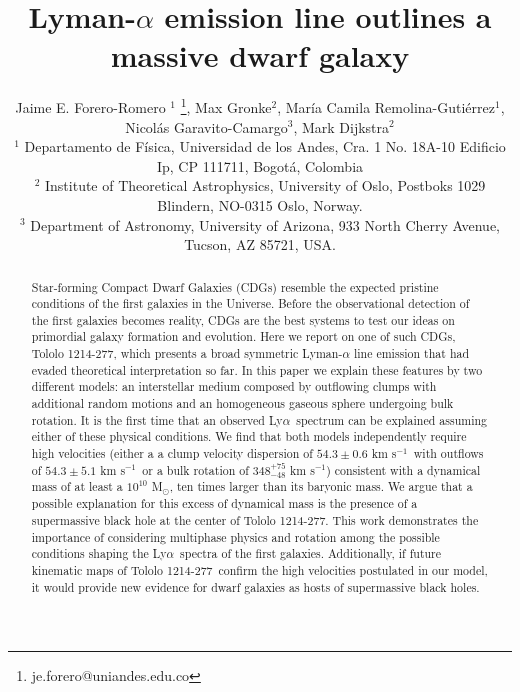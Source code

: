\documentclass[a4,useAMS,usenatbib,usegraphicx]{mn2e}
\newcommand{\tol}{Tololo 1214-277}
\newcommand{\lya}{Ly$\alpha$}
\newcommand{\sigmaclump}{$54.3\pm 0.6$ km s$^{-1}$}
\newcommand{\inftyclump}{$54.3\pm 5.1$ km s$^{-1}$}
\begin{document}
\title[Atypical Dwarf LAE]{
Lyman-$\alpha$ emission line outlines a massive dwarf galaxy}
\author[J.E. Forero-Romero et al.]
{Jaime E. Forero-Romero $^{1}$ \thanks{je.forero@uniandes.edu.co},
Max Gronke$^2$, 
Mar\'ia Camila Remolina-Guti\'errez$^1$,
\newauthor
Nicol\'as Garavito-Camargo$^3$, 
Mark Dijkstra$^2$\\
$^1$ Departamento de F\'isica, Universidad de los Andes, Cra. 1
  No. 18A-10 Edificio Ip, CP 111711, Bogot\'a, Colombia \\
$^2$ Institute of Theoretical Astrophysics, University of Oslo,
Postboks 1029 Blindern, NO-0315 Oslo, Norway.\\
$^3$ Department of Astronomy, University of Arizona, 933 North Cherry
Avenue, Tucson, AZ 85721, USA. 
}


\maketitle


\begin{abstract}
  Star-forming Compact Dwarf Galaxies (CDGs) resemble the expected
  pristine conditions of the first galaxies in the Universe.    
Before the observational detection of the first galaxies becomes
reality, CDGs are the best systems to test our ideas on primordial
galaxy formation and evolution.    
Here we report on one of such CDGs, \tol, which presents
a broad symmetric Lyman-$\alpha$ line emission that had evaded theoretical
interpretation so far. 
In this paper we explain these features by two different models: 
an interstellar medium composed by outflowing clumps with additional
random motions and an homogeneous gaseous sphere undergoing bulk rotation.
It is the first time that an observed \lya\ spectrum can be explained
assuming either of these physical conditions.
We find that both models independently require high velocities
(either a  a clump velocity dispersion of \sigmaclump\ with outflows of
\inftyclump\ or a bulk rotation of $348^{+75}_{-48}$ km s$^{-1}$)
consistent with a dynamical mass of at 
least a $10^{10}$ M$_{\odot}$, ten times larger than its baryonic mass.   
We argue that a possible explanation for this excess of
dynamical mass is the presence of a supermassive black hole at the
center of \tol. 
This work demonstrates the importance of considering multiphase
physics and rotation among the possible conditions shaping the
\lya\ spectra of the first galaxies.  
Additionally, if future kinematic maps of \tol\ confirm the high
velocities postulated in our model, it would provide new
evidence for dwarf galaxies as hosts of supermassive black
holes.  
\end{abstract}
\end{document}
